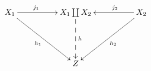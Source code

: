 \documentclass{standalone}
\begin{document}
\Large
\(\displaystyle
\xymatrix@C+24pt@R+24pt{
X_1  \ar[rd]_{h_1} \ar[r]^(0.4){j_1}  & X_1 \coprod X_2 \ar@{-->}[d]^{h}
 & X_2 \ar[l]_(0.4){j_2} \ar[dl]^{h_2} \\
& Z & 
}
\)
\end{document}

